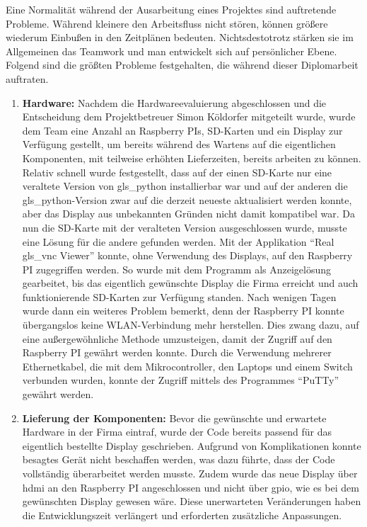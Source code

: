 Eine Normalität während der Ausarbeitung eines Projektes sind auftretende Probleme. Während kleinere den Arbeitsfluss nicht stören, können größere wiederum Einbußen in den Zeitplänen bedeuten. Nichtsdestotrotz stärken sie im Allgemeinen das Teamwork und man entwickelt sich auf persönlicher Ebene.\\ Folgend sind die größten Probleme festgehalten, die während dieser Diplomarbeit auftraten.

\begin{enumerate}
	\item \textbf{Hardware:} Nachdem die Hardwareevaluierung abgeschlossen und die Entscheidung dem Projektbetreuer Simon Köldorfer mitgeteilt wurde, wurde dem Team eine Anzahl an Raspberry PIs, SD-Karten und ein Display zur Verfügung gestellt, um bereits während des Wartens auf die eigentlichen Komponenten, mit teilweise erhöhten Lieferzeiten, bereits arbeiten zu können. Relativ schnell wurde festgestellt, dass auf der einen SD-Karte nur eine veraltete Version von \gls{gls_python} installierbar war und auf der anderen die \gls{gls_python}-Version zwar auf die derzeit neueste aktualisiert werden konnte, aber das Display aus unbekannten Gründen nicht damit kompatibel war. Da nun die SD-Karte mit der veralteten Version ausgeschlossen wurde, musste eine Lösung für die andere gefunden werden. Mit der Applikation \enquote{Real \gls{gls_vnc} Viewer} konnte, ohne Verwendung des Displays, auf den Raspberry PI zugegriffen werden. So wurde mit dem Programm als Anzeigelösung gearbeitet, bis das eigentlich gewünschte Display die Firma erreicht und auch funktionierende SD-Karten zur Verfügung standen. Nach wenigen Tagen wurde dann ein weiteres Problem bemerkt, denn der Raspberry PI konnte übergangslos keine WLAN-Verbindung mehr herstellen. Dies zwang dazu, auf eine außergewöhnliche Methode umzusteigen, damit der Zugriff auf den Raspberry PI gewährt werden konnte. Durch die Verwendung mehrerer Ethernetkabel, die mit dem Mikrocontroller, den Laptops und einem Switch verbunden wurden, konnte der Zugriff mittels des Programmes \enquote{PuTTy} gewährt werden.
	\item \textbf{Lieferung der Komponenten:} Bevor die gewünschte und erwartete Hardware in der Firma eintraf, wurde der Code bereits passend für das eigentlich bestellte Display geschrieben. Aufgrund von Komplikationen konnte besagtes Gerät nicht beschaffen werden, was dazu führte, dass der Code vollständig überarbeitet werden musste. Zudem wurde das neue Display über \ac{hdmi} an den Raspberry PI angeschlossen und nicht über \ac{gpio}, wie es bei dem gewünschten Display gewesen wäre. Diese unerwarteten Veränderungen haben die Entwicklungszeit verlängert und erforderten zusätzliche Anpassungen.

\end{enumerate}
